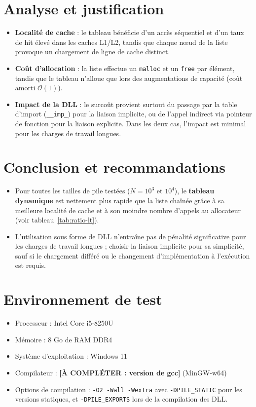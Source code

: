\documentclass[12pt]{article}
\begin{document}
\section{Analyse et justification}
\begin{itemize}
  \item \textbf{Localité de cache} : le tableau bénéficie d'un accès séquentiel
        et d'un taux de hit élevé dans les caches L1/L2, tandis que chaque nœud
        de la liste provoque un chargement de ligne de cache distinct.
  \item \textbf{Coût d'allocation} : la liste effectue un \texttt{malloc} et un
        \texttt{free} par élément, tandis que le tableau n'alloue que lors
        des augmentations de capacité (coût amorti \(\mathcal{O}(1)\)).
  \item \textbf{Impact de la DLL} : le surcoût provient surtout du passage par
        la table d'import (\texttt{__imp\_}) pour la liaison implicite, ou de
        l'appel indirect via pointeur de fonction pour la liaison explicite.
        Dans les deux cas, l'impact est minimal pour les charges de travail longues.
\end{itemize}

\section{Conclusion et recommandations}
\begin{itemize}
  \item Pour toutes les tailles de pile testées (\(N = 10^3\) et \(10^4\)), le
        \textbf{tableau dynamique} est nettement plus rapide que la liste chaînée
        grâce à sa meilleure localité de cache et à son moindre nombre d'appels
        au allocateur (voir tableau~\ref{tab:ratio-lt}).
  \item L'utilisation sous forme de DLL n'entraîne pas de pénalité significative
        pour les charges de travail longues ; choisir la liaison implicite
        pour sa simplicité, sauf si le chargement différé ou le changement
        d'implémentation à l'exécution est requis.
\end{itemize}

\section{Environnement de test}
\begin{itemize}
  \item Processeur : Intel Core i5-8250U
  \item Mémoire : 8 Go de RAM DDR4
  \item Système d'exploitation : Windows 11
  \item Compilateur : \textbf{[À COMPLÉTER : version de gcc]} (MinGW-w64)
  \item Options de compilation : \texttt{-O2 -Wall -Wextra} avec
        \texttt{-DPILE\_STATIC} pour les versions statiques, et
        \texttt{-DPILE\_EXPORTS} lors de la compilation des DLL.
\end{itemize}
\end{document}
